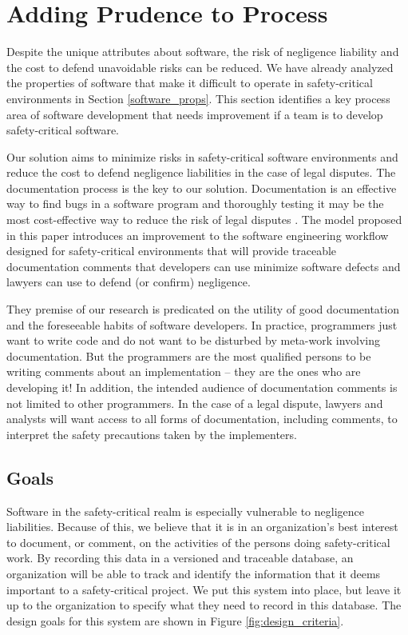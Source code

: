 \section{Adding Prudence to Process}\label{solution}
Despite the unique attributes about software, the risk of negligence liability
and the cost to defend unavoidable risks can be reduced. We have already
analyzed the properties of software that make it difficult to operate in
safety-critical environments in Section \ref{software_props}. This section
identifies a key process area of software development that needs improvement if
a team is to develop safety-critical software.

Our solution aims to minimize risks in safety-critical software environments and
reduce the cost to defend negligence liabilities in the case of legal disputes.
The documentation process is the key to our solution. Documentation is an
effective way to find bugs in a software program and thoroughly testing it may
be the most cost-effective way to reduce the risk of legal disputes
\cite{Kaner_doc_1995}. The model proposed in this paper introduces an
improvement to the software engineering workflow designed for safety-critical
environments that will provide traceable documentation comments that developers
can use minimize software defects and lawyers can use to defend (or confirm)
negligence.

They premise of our research is predicated on the utility of good documentation
and the foreseeable habits of software developers. In practice, programmers just
want to write code and do not want to be disturbed by meta-work involving
documentation. But the programmers are the most qualified persons to be writing
comments about an implementation -- they are the ones who are developing it! In
addition, the intended audience of documentation comments is not limited to
other programmers. In the case of a legal dispute, lawyers and analysts will
want access to all forms of documentation, including comments, to interpret the
safety precautions taken by the implementers.

\subsection{Goals}
Software in the safety-critical realm is especially vulnerable to negligence
liabilities. Because of this, we believe that it is in an organization's best
interest to document, or comment, on the activities of the persons doing
safety-critical work. By recording this data in a versioned and traceable 
database, an organization will be able to track and identify the information
that it deems important to a safety-critical project. We put this system into
place, but leave it up to the organization to specify what they need to record
in this database. The design goals for this system are shown in Figure 
\ref{fig:design_criteria}.

